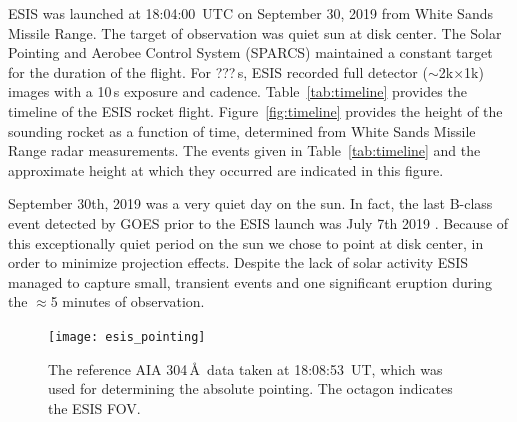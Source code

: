 {		ESIS was launched at 18:04:00~UTC on September 30, 2019 from White Sands Missile Range.  
		The target of observation was quiet sun at disk center.  
		The Solar Pointing and Aerobee Control System (SPARCS) maintained a constant target for the duration of the flight.  
		For ???\,s, ESIS recorded full detector ($\sim$2k$\times$1k) images with a 10\,s exposure and cadence. 
		Table~\ref{tab:timeline} provides the timeline of the ESIS rocket flight. Figure~\ref{fig:timeline} provides the height of the sounding rocket as a function of time, determined from White Sands Missile Range radar measurements.  The events given in Table~\ref{tab:timeline} and the approximate height at which they occurred are indicated in this figure.

		September 30th, 2019 was a very quiet day on the sun.  
		In fact, the last  B-class event detected by GOES \citep{GOES} prior to the ESIS launch was July 7th 2019 .  
		Because of this exceptionally quiet period on the sun we chose to point at disk center, in order to minimize projection effects.  
		Despite the lack of solar activity ESIS managed to capture  small, transient events and one significant eruption during the $\approx$5 minutes of observation.
		
		\begin{figure}[ht]
			\begin{center}
				\texttt{[image: esis\_pointing]}
				\caption{The reference AIA 304\,\AA\ data taken at 18:08:53~UT, which was used for determining the absolute pointing. The octagon indicates the ESIS FOV.}
				\label{fig:fov}
			\end{center}
		\end{figure}
	
}

